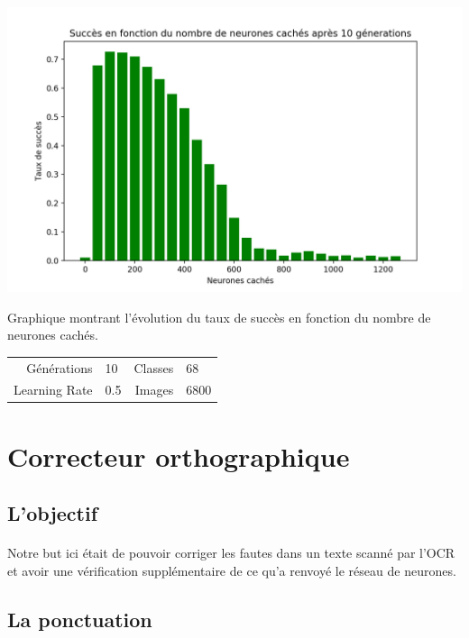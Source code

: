 \documentclass{article}
\begin{document}
\begin{center}
	\includegraphics[scale=0.3]{hiddenNodesGraph.png}
	
	Graphique montrant l'évolution du taux de succès en fonction du nombre de neurones cachés.
	
	\begin{tabular}{r@{: }l r@{: }l}
		Générations & 10 & Classes & 68 \\
		Learning Rate & 0.5 & Images & 6800 \\
	\end{tabular}
	
\end{center}







\newpage
{}
\section{Correcteur orthographique}

\subsection{L'objectif}

\paragraph{}Notre but ici était de pouvoir corriger les fautes dans un texte scanné par l’OCR et avoir une vérification supplémentaire de ce qu’a renvoyé le réseau de neurones.

\subsection{La ponctuation}
\end{document}

